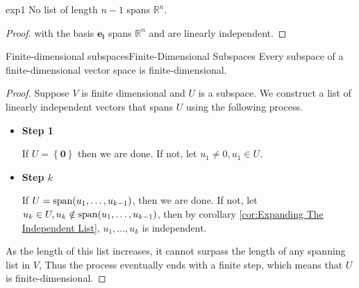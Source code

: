\documentclass[../main.tex]{subfiles}
\begin{document}
\begin{example}{}{exp1}
No list of length $n-1$ spans $\mathbb{R}^n$.
\end{example}
\begin{proof}
with the basis $\boldsymbol{e_i}$ spans $\mathbb{R}^n$ and are linearly independent.
\end{proof}

\begin{theorem}{Finite-dimensional subspaces}{Finite-Dimensional Subspaces}
Every subspace of a finite-dimensional vector space is finite-dimensional.
\end{theorem}
\begin{proof}
Suppose $V$ is finite dimensional and $U$ is a subspace. We construct a list of linearly independent vectors that spans $U$ using the following process.

\begin{itemize}
\item \textbf{Step 1}

	If $U=\left\{ \boldsymbol{0} \right\}$ then we are done. If not, let $u_1\neq 0,u_1 \in U$.
\item \textbf{Step $k$}

	If $U = \operatorname{span}(u_1, \ldots ,u_{k-1})$, then we are done. If not, let $u_k \in U, u_k \notin \operatorname{span}(u_1, \ldots ,u_{k-1})$, then by corollary \ref{cor:Expanding The Independent List}, $u_1, \ldots ,u_k$ is independent.
\end{itemize}

As the length of this list increases, it cannot surpass the length of any spanning list in $V$, Thus the process eventually ends with a finite step, which means that $U$ is finite-dimensional.
\end{proof}
\end{document}
